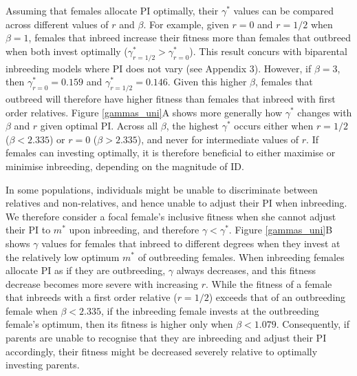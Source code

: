 \documentclass[12pt]{article}
\begin{document}
Assuming that females allocate PI optimally, their $\gamma^{*}$ values can be compared across different values of $r$ and $\beta$. For example, given $r=0$ and $r=1/2$ when $\beta=1$, females that inbreed increase their fitness more than females that outbreed when both invest optimally ($\gamma^{*}_{r=1/2}>\gamma^{*}_{r=0}$). This result concurs with biparental inbreeding models where PI does not vary (see Appendix 3). However, if $\beta=3$, then $\gamma^{*}_{r=0}=0.159$ and $\gamma^{*}_{r=1/2}=0.146$. Given this higher $\beta$, females that outbreed will therefore have higher fitness than females that inbreed with first order relatives. Figure \ref{gammas_uni}A shows more generally how $\gamma^{*}$ changes with $\beta$ and $r$ given optimal PI. Across all $\beta$, the highest $\gamma^{*}$ occurs either when $r=1/2$ ($\beta < 2.335$) or $r=0$ ($\beta > 2.335$), and never for intermediate values of $r$. If females can investing optimally, it is therefore beneficial to either maximise or minimise inbreeding, depending on the magnitude of ID.

In some populations, individuals might be unable to discriminate between relatives and non-relatives, and hence unable to adjust their PI when inbreeding. We therefore consider a focal female's inclusive fitness when she cannot adjust their PI to $m^{*}$ upon inbreeding, and therefore $\gamma < \gamma^{*}$. Figure \ref{gammas_uni}B shows $\gamma$ values for females that inbreed to different degrees when they invest at the relatively low optimum $m^{*}$ of outbreeding females. When inbreeding females allocate PI as if they are outbreeding, $\gamma$ always decreases, and this fitness decrease becomes more severe with increasing $r$. While the fitness of a female that inbreeds with a first order relative ($r=1/2$) exceeds that of an outbreeding female when $\beta < 2.335$, if the inbreeding female invests at the outbreeding female's optimum, then its fitness is higher only when $\beta < 1.079$. Consequently, if parents are unable to recognise that they are inbreeding and adjust their PI accordingly, their fitness might be decreased severely relative to optimally investing parents. 
\end{document}
